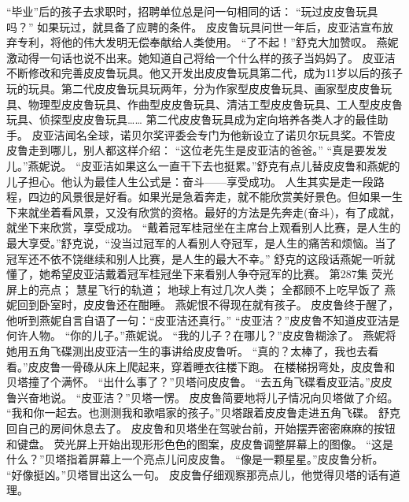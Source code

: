 \documentclass[a4paper,12pt,UTF8,twoside]{ctexbook}
\begin{document}
        “毕业”后的孩子去求职时，招聘单位总是问一句相同的话：  
        “玩过皮皮鲁玩具吗？”  
        如果玩过，就具备了应聘的条件。  
        皮皮鲁玩具问世一年后，皮亚洁宣布放弃专利，将他的伟大发明无偿奉献给人类使用。  
        “了不起！”舒克大加赞叹。  
        燕妮激动得一句话也说不出来。她知道自己将给一个什么样的孩子当妈妈了。  
        皮亚洁不断修改和完善皮皮鲁玩具。他又开发出皮皮鲁玩具第二代，成为11岁以后的孩子玩的玩具。第二代皮皮鲁玩具玩两年，分为作家型皮皮鲁玩具、画家型皮皮鲁玩具、物理型皮皮鲁玩具、作曲型皮皮鲁玩具、清洁工型皮皮鲁玩具、工人型皮皮鲁玩具、侦探型皮皮鲁玩具……  
        第二代皮皮鲁玩具成为定向培养各类人才的最佳助手。        
        皮亚洁闻名全球，诺贝尔奖评委会专门为他新设立了诺贝尔玩具奖。不管皮皮鲁走到哪儿，别人都这样介绍：  
        “这位老先生是皮亚洁的爸爸。”  
        “真是要发发儿。”燕妮说。  
        “皮亚洁如果这么一直干下去也挺累。”舒克有点儿替皮皮鲁和燕妮的儿子担心。他认为最佳人生公式是：奋斗——享受成功。  
        人生其实是走一段路程，四边的风景很是好看。如果光是急着奔走，就不能欣赏美好景色。但如果一生下来就坐着看风景，又没有欣赏的资格。最好的方法是先奔走(奋斗)，有了成就，就坐下来欣赏，享受成功。  
        “戴着冠军桂冠坐在主席台上观看别人比赛，是人生的最大享受。”舒克说，“没当过冠军的人看别人夺冠军，是人生的痛苦和烦恼。当了冠军还不依不饶继续和别人比赛，是人生的最大不幸。”  
        舒克的这段话燕妮一听就懂了，她希望皮亚洁戴着冠军桂冠坐下来看别人争夺冠军的比赛。   第287集  
        荧光屏上的亮点；  
        慧星飞行的轨道；  
        地球上有过几次人类；  
        全都顾不上吃早饭了    
        燕妮回到卧室时，皮皮鲁还在酣睡。  
        燕妮恨不得现在就有孩子。  
        皮皮鲁终于醒了，他听到燕妮自言自语了一句：“皮亚洁还真行。”  
        “皮亚洁？”皮皮鲁不知道皮亚洁是何许人物。  
        “你的儿子。”燕妮说。  
        “我的儿子？在哪儿？”皮皮鲁糊涂了。  
        燕妮将她用五角飞碟测出皮亚洁一生的事讲给皮皮鲁听。  
        “真的？太棒了，我也去看看。”皮皮鲁一骨碌从床上爬起来，穿着睡衣往楼下跑。        
        在楼梯拐弯处，皮皮鲁和贝塔撞了个满怀。  
        “出什么事了？”贝塔问皮皮鲁。  
        “去五角飞碟看皮亚洁。”皮皮鲁兴奋地说。  
        “皮亚洁？”贝塔一愣。  
        皮皮鲁简要地将儿子情况向贝塔做了介绍。  
        “我和你一起去。也测测我和歌唱家的孩子。”贝塔跟着皮皮鲁走进五角飞碟。  
        舒克回自己的房间休息去了。  
        皮皮鲁和贝塔坐在驾驶台前，开始摆弄密密麻麻的按钮和键盘。  
        荧光屏上开始出现形形色色的图案，皮皮鲁调整屏幕上的图像。  
        “这是什么？”贝塔指着屏幕上一个亮点儿问皮皮鲁。  
        “像是一颗星星。”皮皮鲁分析。  
        “好像挺凶。”贝塔冒出这么一句。  
        皮皮鲁仔细观察那亮点儿，他觉得贝塔的话有道理。  
\end{document}
